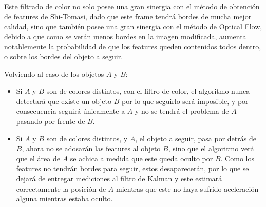 Este filtrado de color no solo posee una gran sinergia con el método de obtención de features de Shi-Tomasi, dado que este frame tendrá bordes de mucha mejor calidad, sino que también posee una gran sinergia con el método de Optical Flow, debido a que como se verán menos bordes en la imagen modificada, aumenta notablemente la probabilidad de que los features queden contenidos todos dentro, o sobre los bordes del objeto a seguir.

Volviendo al caso de los objetos $A$ y $B$:

\begin{itemize}
\item Si $A$ y $B$ son de colores distintos, con el filtro de color, el algoritmo nunca detectará que existe un objeto $B$ por lo que seguirlo será imposible, y por consecuencia seguirá únicamente a $A$ y no se tendrá el problema de $A$ pasando por frente de $B$.
\item Si $A$ y $B$ son de colores distintos, y $A$, el objeto a seguir, pasa por detrás de $B$, ahora no se adosarán las features al objeto $B$, sino que el algoritmo verá que el área de $A$ se achica a medida que este queda oculto por $B$. Como los features no tendrán bordes para seguir, estos desaparecerán, por lo que se dejará de entregar mediciones al filtro de Kalman y este estimará correctamente la posición de $A$ mientras que este no haya sufrido aceleración alguna mientras estaba oculto. 
\end{itemize}

